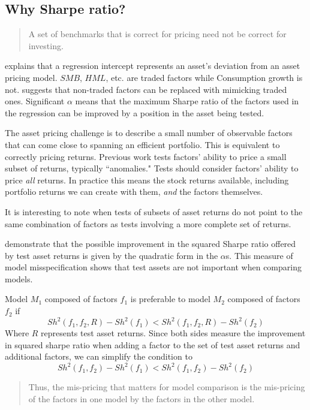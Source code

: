 
\subsection{Why Sharpe ratio? \textcite{barillas2016alpha}}

\textcite{pastor2000comparing}
\begin{quotation}
  A set of benchmarks that is correct for pricing need not be correct for 
  investing.
\end{quotation}


\textcite{jensen1968performance} explains that a regression intercept 
represents 
an asset's deviation from an asset pricing model.
$SMB$, $HML$, etc. are traded factors while Consumption growth is not.
\textcite{breeden2005intertemporal} suggests that non-traded factors can be 
replaced with mimicking traded ones.
Significant $\alpha$ means that the maximum Sharpe ratio of the factors used 
in the regression can be improved by a position in the asset being tested.

The asset pricing challenge is to describe a small number of observable 
factors that can come close to spanning an efficient portfolio. This is 
equivalent to correctly pricing returns.
Previous work tests factors' ability to price a small subset of returns, 
typically ``anomalies."
Tests should consider factors' ability to price \emph{all} returns.
In practice this means the stock returns available, including portfolio 
returns we can create with them, \emph{and} the factors themselves.

It is interesting to note when tests of subsets of asset returns do not point 
to the same combination of factors as tests involving a more complete set of 
returns.

\textcite{gibbons1989test} demonstrate that the possible improvement in the 
squared Sharpe ratio offered by test asset returns is given by the quadratic 
form in the $\alpha$s.
This measure of model misspecification shows that test assets are not 
important when comparing models.

Model $M_1$ composed of factors $f_1$ is preferable to model $M_2$ composed of 
factors $f_2$ if
\[
Sh^2(f_1, f_2, R) - Sh^2(f_1) < Sh^2(f_1, f_2, R) - Sh^2(f_2)
\]
Where $R$ represents test asset returns.
Since both sides measure the improvement in squared sharpe ratio when adding a 
factor to the set of test asset returns and additional factors,
we can simplify the condition to
\[
Sh^2(f_1, f_2) - Sh^2(f_1) < Sh^2(f_1, f_2) - Sh^2(f_2)
\]
\begin{quotation}
  Thus, the mis-pricing that matters for model comparison is the mis-pricing 
  of the factors in one model by the factors in the other model.
\end{quotation}

